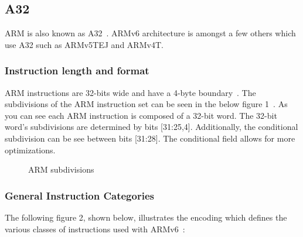 \documentclass[11pt]{report}
\begin{document}
\subsection{A32}
\begin{doublespace}
ARM is also known as A32~\citep{A32}. ARMv6 architecture is amongst a few others which use A32 such as ARMv5TEJ and ARMv4T. 
\subsubsection{ Instruction length and format}
ARM instructions are 32-bits wide and have a 4-byte boundary~\citep{A32}. The subdivisions of the ARM instruction set can be seen in the below figure 1~\citep[A5-2]{referenceB}. As you can see each ARM instruction is composed of a 32-bit word. The 32-bit word's subdivisions are determined by bits [31:25,4]. Additionally, the conditional subdivision can be see between bits [31:28]. The conditional field allows for more optimizations.
\end{doublespace}

\begin{center}
\begin{figure}[H] 
\caption{ARM subdivisions}
\end{figure}
\end{center}
\subsubsection{General Instruction Categories}
\begin{doublespace}
The following figure 2, shown below, illustrates the encoding which defines the various classes of instructions used with ARMv6~\citep[A5-2]{referenceB}:
\end{doublespace}
\end{document}
